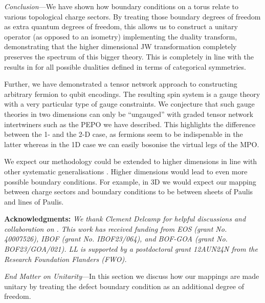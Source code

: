 \documentclass[aps,prl,twocolumn,floatfix,10pt,amssymb,amsfont,amsmath,superscriptaddress,float,nofootinbib,longbibliography,nobalancelastpage]{revtex4-2}
\begin{document}
\textit{Conclusion}---We have shown how boundary conditions on a torus relate to various topological charge sectors. By treating those boundary degrees of freedom as extra quantum degrees of freedom, this allows us to construct a unitary operator (as opposed to an isometry) 
implementing the duality transform, demonstrating that the higher dimensional JW transformation completely preserves the spectrum of this bigger theory. This is completely in line with the results in \cite{lootens2023lowdepth, Lootens_2023, Lootens:2022avn} for all possible dualities defined in terms of categorical symmetries. 

Further, we have demonstrated a tensor network approach to constructing arbitrary fermion to qubit encodings. The resulting spin system is a gauge theory with a very particular type of gauge constraints. We conjecture that such gauge theories in two dimensions can only be ``ungauged''  with graded tensor network intertwiners such as the PEPO we have described. This highlights the difference between the 1- and the 2-D case, as fermions seem to be indispenable in the latter whereas in the 1D case we can easily bosonise the virtual legs of the MPO. 

We expect our methodology could be extended to higher dimensions in line with other systematic generalisations \cite{threeboson, arbboson}. Higher dimensions would lead to even more possible boundary conditions. For example, in 3D we would expect our mapping between charge sectors and boundary conditions to be between sheets of Paulis and lines of Paulis. 

\medskip\noindent
\begin{acknowledgments}
\textbf{Acknowledgments:} \emph{We thank Clement Delcamp for helpful discussions and collaboration on \cite{lootens2023lowdepth,Lootens_2023, Lootens:2022avn}. This work has received funding from EOS (grant No. 40007526), IBOF (grant No. IBOF23/064), and BOF-GOA (grant No. BOF23/GOA/021). LL is supported by a postdoctoral grant 12AUN24N from the Research Foundation Flanders (FWO).}
\end{acknowledgments}


\textit{End Matter on Unitarity}---In this section we discuss how our mappings are made unitary by treating the defect boundary condition as an additional degree of freedom.
\end{document}
